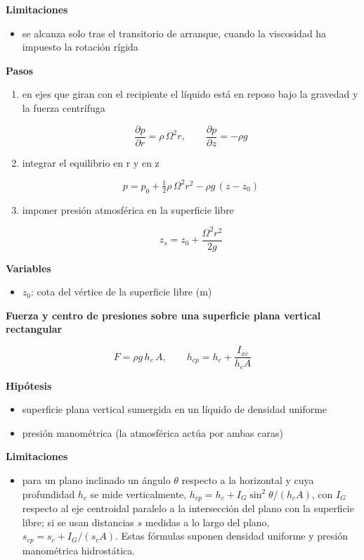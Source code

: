 \documentclass[10pt,openany]{book}
\begin{document}
\begin{tcolorbox}[title={Desarrollos del modelo}, studiumdef, breakable]
\noindent\textbf{Limitaciones}
\begin{itemize}
\item se alcanza solo tras el transitorio de arranque, cuando la viscosidad ha impuesto la rotación rígida
\end{itemize}

\noindent\textbf{Pasos}
\begin{enumerate}
\item
en ejes que giran con el recipiente el líquido está en reposo bajo la gravedad y la fuerza centrífuga

\[
\frac{\partial p}{\partial r} = \rho\,\Omega^{2} r,\qquad \frac{\partial p}{\partial z} = -\rho g
\]
\item
integrar el equilibrio en r y en z

\[
p = p_0 + \tfrac12\rho\,\Omega^{2} r^{2} - \rho g\,(z - z_0)
\]
\item
imponer presión atmosférica en la superficie libre

\[
z_s = z_0 + \frac{\Omega^{2} r^{2}}{2g}
\]
\end{enumerate}

\noindent\textbf{Variables}
\begin{itemize}
\item $z_{0}$: cota del vértice de la superficie libre ($\mathrm{m}$)
\end{itemize}



\noindent\textbf{Fuerza y centro de presiones sobre una superficie plana vertical rectangular}

\begin{equation}
F = \rho g\,h_c\,A,\qquad h_{cp} = h_c + \frac{I_{xc}}{h_c A}
\label{eq:c05-superficie}
\end{equation}

\noindent\textbf{Hipótesis}
\begin{itemize}
\item superficie plana vertical sumergida en un líquido de densidad uniforme
\item presión manométrica (la atmosférica actúa por ambas caras)
\end{itemize}

\noindent\textbf{Limitaciones}
\begin{itemize}
\item para un plano inclinado un ángulo \(\theta\) respecto a la horizontal y cuya profundidad \(h_c\) se mide verticalmente, \(h_{cp}=h_c+I_G\sin^2\theta/(h_c A)\), con \(I_G\) respecto al eje centroidal paralelo a la intersección del plano con la superficie libre; si se usan distancias \(s\) medidas a lo largo del plano, \(s_{cp}=s_c+I_G/(s_c A)\). Estas fórmulas suponen densidad uniforme y presión manométrica hidrostática.
\end{itemize}


\end{tcolorbox}
\end{document}
